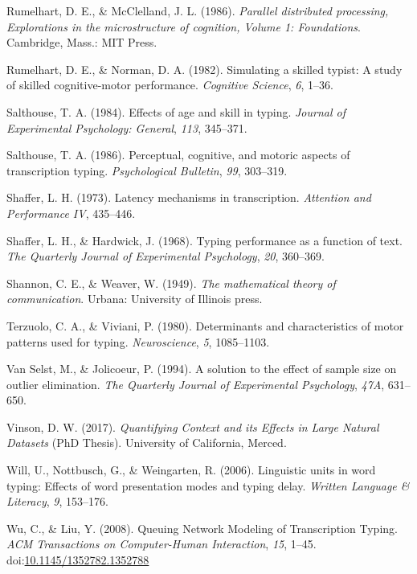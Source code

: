\documentclass[,man,floatsintext]{apa6}
\begin{document}
\leavevmode\hypertarget{ref-rumelhart_parallel_1986}{}%
Rumelhart, D. E., \& McClelland, J. L. (1986). \emph{Parallel distributed processing, Explorations in the microstructure of cognition, Volume 1: Foundations}. Cambridge, Mass.: MIT Press.

\leavevmode\hypertarget{ref-RumelhartSimulatingskilledtypist1982}{}%
Rumelhart, D. E., \& Norman, D. A. (1982). Simulating a skilled typist: A study of skilled cognitive-motor performance. \emph{Cognitive Science}, \emph{6}, 1--36.

\leavevmode\hypertarget{ref-salthouse_effects_1984}{}%
Salthouse, T. A. (1984). Effects of age and skill in typing. \emph{Journal of Experimental Psychology: General}, \emph{113}, 345--371.

\leavevmode\hypertarget{ref-salthouse_perceptual_1986}{}%
Salthouse, T. A. (1986). Perceptual, cognitive, and motoric aspects of transcription typing. \emph{Psychological Bulletin}, \emph{99}, 303--319.

\leavevmode\hypertarget{ref-shaffer_latency_1973}{}%
Shaffer, L. H. (1973). Latency mechanisms in transcription. \emph{Attention and Performance IV}, 435--446.

\leavevmode\hypertarget{ref-shaffer_typing_1968}{}%
Shaffer, L. H., \& Hardwick, J. (1968). Typing performance as a function of text. \emph{The Quarterly Journal of Experimental Psychology}, \emph{20}, 360--369.

\leavevmode\hypertarget{ref-Shannonmathematicaltheorycommunication1949}{}%
Shannon, C. E., \& Weaver, W. (1949). \emph{The mathematical theory of communication}. Urbana: University of Illinois press.

\leavevmode\hypertarget{ref-terzuolo_determinants_1980}{}%
Terzuolo, C. A., \& Viviani, P. (1980). Determinants and characteristics of motor patterns used for typing. \emph{Neuroscience}, \emph{5}, 1085--1103.

\leavevmode\hypertarget{ref-van_selst_solution_1994}{}%
Van Selst, M., \& Jolicoeur, P. (1994). A solution to the effect of sample size on outlier elimination. \emph{The Quarterly Journal of Experimental Psychology}, \emph{47A}, 631--650.

\leavevmode\hypertarget{ref-vinson_quantifying_2017}{}%
Vinson, D. W. (2017). \emph{Quantifying Context and its Effects in Large Natural Datasets} (PhD Thesis). University of California, Merced.

\leavevmode\hypertarget{ref-will_linguistic_2006}{}%
Will, U., Nottbusch, G., \& Weingarten, R. (2006). Linguistic units in word typing: Effects of word presentation modes and typing delay. \emph{Written Language \& Literacy}, \emph{9}, 153--176.

\leavevmode\hypertarget{ref-wu_queuing_2008}{}%
Wu, C., \& Liu, Y. (2008). Queuing Network Modeling of Transcription Typing. \emph{ACM Transactions on Computer-Human Interaction}, \emph{15}, 1--45. doi:\href{https://doi.org/10.1145/1352782.1352788}{10.1145/1352782.1352788}

\endgroup
\end{document}
